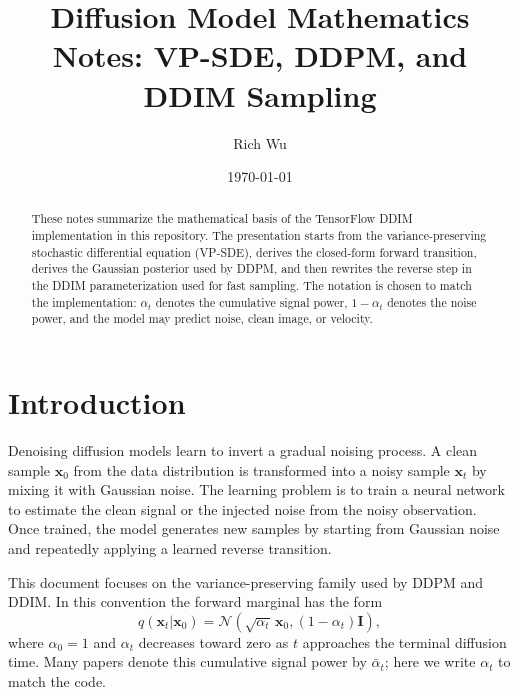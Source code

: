\documentclass[11pt]{article}
\title{Diffusion Model Mathematics Notes: VP-SDE, DDPM, and DDIM Sampling}
\author{Rich Wu}
\date{\today}
\newcommand{\bx}{\mathbf{x}}
\newcommand{\bI}{\mathbf{I}}
\newcommand{\N}{\mathcal{N}}
\begin{document}
\maketitle

\begin{abstract}
These notes summarize the mathematical basis of the TensorFlow DDIM implementation in this repository.
The presentation starts from the variance-preserving stochastic differential equation (VP-SDE), derives
the closed-form forward transition, derives the Gaussian posterior used by DDPM, and then rewrites the
reverse step in the DDIM parameterization used for fast sampling.  The notation is chosen to match the
implementation: $\alpha_t$ denotes the cumulative signal power, $1-\alpha_t$ denotes the noise power,
and the model may predict noise, clean image, or velocity.
\end{abstract}

\section{Introduction}

Denoising diffusion models learn to invert a gradual noising process.  A clean sample $\bx_0$ from the
data distribution is transformed into a noisy sample $\bx_t$ by mixing it with Gaussian noise.  The
learning problem is to train a neural network to estimate the clean signal or the injected noise from
the noisy observation.  Once trained, the model generates new samples by starting from Gaussian noise
and repeatedly applying a learned reverse transition.

This document focuses on the variance-preserving family used by DDPM and DDIM.  In this convention the
forward marginal has the form
\begin{equation}
  q(\bx_t|\bx_0) = \N\!\left(\sqrt{\alpha_t}\,\bx_0, (1-\alpha_t)\bI\right),
  \label{eq:forward_marginal_intro}
\end{equation}
where $\alpha_0=1$ and $\alpha_t$ decreases toward zero as $t$ approaches the terminal diffusion time.
Many papers denote this cumulative signal power by $\bar{\alpha}_t$; here we write $\alpha_t$ to match
the code.
\end{document}

